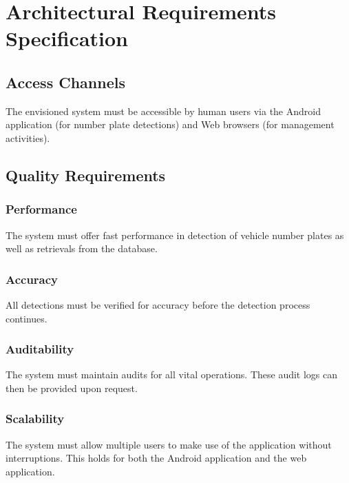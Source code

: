 \documentclass[12pt]{article}
\begin{document}
                \section{Architectural Requirements Specification}
                		\subsection{Access Channels }
                				The envisioned system must be accessible by human users via the Android application (for number plate detections) and Web browsers (for management activities).
                			
                		\subsection{Quality Requirements}
                		
                				\subsubsection{Performance}
		   			                  	The system must offer fast performance in detection of vehicle number plates as well as retrievals from the database. 
		   			                  	
                			    \subsubsection{Accuracy}
                			    		All detections must be verified for accuracy before the detection process continues.
                			    		             	
                				\subsubsection{Auditability}
		   			                   	The system must maintain audits for all vital operations. These audit logs can then be provided upon request. 
		   			            		
		   			            		
                				\subsubsection{Scalability}
	   			                   		The system must allow multiple users to make use of the application without interruptions. This holds for both the Android application and the web application.
		       			                  	
\end{document}

